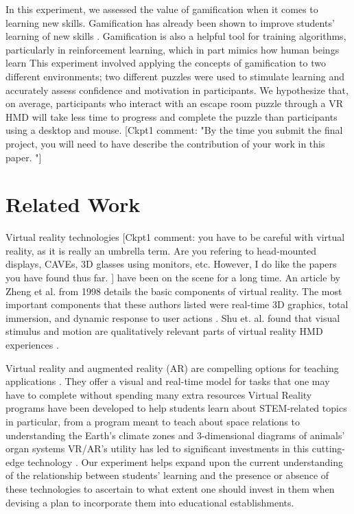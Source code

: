\documentclass[manuscript,screen,review]{acmart}
\begin{document}
In this experiment, we assessed the value of gamification when it comes to learning new skills. Gamification has already been shown to improve students’ learning of new skills \cite{loureiro2020virtual, perez2022can, ausburn2008effects}. Gamification is also a helpful tool for training algorithms, particularly in reinforcement learning, which in part mimics how human beings learn \cite{agostinelli2019solving} This experiment involved applying the concepts of gamification to two different environments; two different puzzles were used to stimulate learning and accurately assess confidence and motivation in participants. We hypothesize that, on average, participants who interact with an escape room puzzle through a VR HMD will take less time to progress and complete the puzzle than participants using a desktop and mouse.  [Ckpt1 comment: "By the time you submit the final project, you will need to have describe the contribution of your work in this paper. "]

\section{Related Work}
Virtual reality technologies [Ckpt1 comment: you have to be careful with virtual reality, as it is really an umbrella term. Are you refering to head-mounted displays, CAVEs, 3D glasses using monitors, etc. However, I do like the papers you have found thus far. ] have been on the scene for a long time. An article by Zheng et al. \cite{zheng1998virtual} from 1998 details the basic components of virtual reality. The most important components that these authors listed were real-time 3D graphics, total immersion, and dynamic response to user actions \cite{zheng1998virtual}. Shu et. al. found that visual stimulus and motion are qualitatively relevant parts of virtual reality HMD experiences \cite{shu2019do}. 

Virtual reality and augmented reality (AR) are compelling options for teaching applications \cite{mahmoud2020does, brown2019an, bricken1991virtual, villagrasa2014teaching}. They offer a visual and real-time model for tasks that one may have to complete without spending many extra resources \cite{mahmoud2020does} Virtual Reality programs have been developed to help students learn about STEM-related topics in particular, from a program meant to teach about space relations to understanding the Earth’s climate zones and 3-dimensional diagrams of animals’ organ systems \cite{oberdorfer2021mutual} VR/AR’s utility has led to significant investments in this cutting-edge technology \cite{martin2022multimodality, oberdorfer2021mutual}. Our experiment helps expand upon the current understanding of the relationship between students’ learning and the presence or absence of these technologies to ascertain to what extent one should invest in them when devising a plan to incorporate them into educational establishments.
\end{document}
